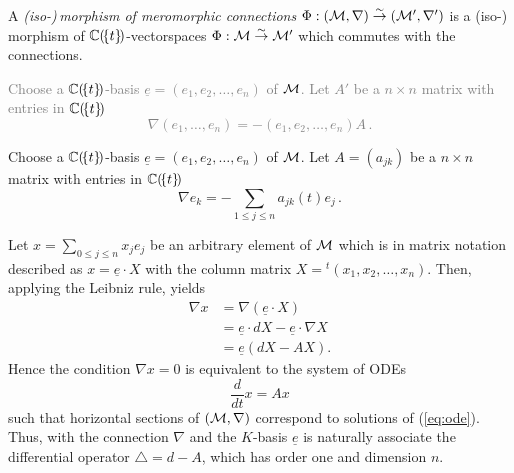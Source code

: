 \begin{defn}
  A \emph{(iso-)\,morphism of meromorphic connections}
  $\Phi:(\mathcal{M},\nabla)\overset{\sim}\to(\mathcal{M}',\nabla')$ is a (iso-)\,morphism of
  $\mathbb{C}(\!\{t\}\!)$-vectorspaces $\Phi:\mathcal{M}\overset{\sim}\to\mathcal{M}'$ which commutes
  with the connections.
\end{defn}
\begin{multicols}{2}
  \textcolor{gray}{%
    Choose a $\mathbb{C}(\!\{t\}\!)$-basis $\underline{e}=(e_1,e_2,\dots,e_n)$ of $\mathcal{M}$.
    Let $A'$ be a $n\times n$ matrix with entries in $\mathbb{C}(\!\{t\}\!)$
    \[
      \nabla\left(e_1,\dots,e_n\right)
      =
      -(e_1,e_2,\dots,e_n)A \,.
    \]
  }

\columnbreak

  Choose a $\mathbb{C}(\!\{t\}\!)$-basis $\underline{e}=(e_1,e_2,\dots,e_n)$ of $\mathcal{M}$.
  Let $A=(a_{jk})$ be a $n\times n$ matrix with entries in $\mathbb{C}(\!\{t\}\!)$
  \[
    \nabla e_k
    =
    -\sum_{1\leq j\leq n} a_{jk}(t)e_j \,.
  \]
\end{multicols}
Let $x=\sum_{0\leq j\leq n}x_je_j$ be an arbitrary element of $\mathcal{M}$ which is in
matrix notation described as $x=\underline{e}\cdot X$ with the column matrix
$X={}^t\!(x_1,x_2 ,\dots,x_n)$.
Then, applying the Leibniz rule, yields
\begin{align*}
  \nabla x&=\nabla\left(\underline{e}\cdot X\right)
  \\&=\underline{e} \cdot dX - \underline{e}\cdot \nabla X
  \\&=\underline{e}\left(dX-AX\right).
\end{align*}
Hence the condition $\nabla x=0$ is equivalent to the system of ODEs
\begin{equation}\label{eq:ode}
  \frac{d}{dt}x=Ax
\end{equation}
such that horizontal sections of $(\mathcal{M},\nabla)$ correspond to solutions of
(\ref{eq:ode}).
Thus, with the connection $\nabla$ and the $K$-basis $\underline{e}$ is
naturally associate the differential operator $\triangle=d-A$, which has order
one and dimension $n$.

